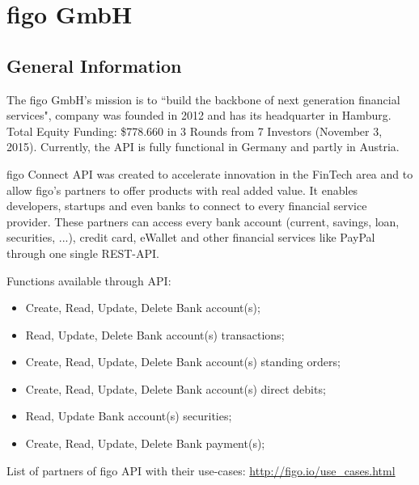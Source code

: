 \chapter{figo GmbH}
\section{General Information}
The figo GmbH’s mission is to “build the backbone of next generation financial services"\cite{figoFAQVision}, company was founded in 2012 and has its headquarter in Hamburg. Total Equity Funding: \$778.660 in 3 Rounds from 7 Investors (November 3, 2015). Currently, the API is fully functional in Germany and partly in Austria.\cite{figoAngel}\cite{figoCB}

figo Connect API was created to accelerate innovation in the FinTech area and to allow figo's partners to offer products with real added value. It enables developers, startups and even banks to connect to every financial service provider. These partners can access every bank account (current, savings, loan, securities, ...), credit card, eWallet and other financial services like PayPal through one single REST-API. \cite{figoFAQWhat}\cite{figoFAQVision}\cite{figoFAQPartners}

Functions available through API:\cite{figoAPI}
\begin{itemize}
	\item Create, Read, Update, Delete Bank account(s);
	\item Read, Update, Delete Bank account(s) transactions;
	\item Create, Read, Update, Delete Bank account(s) standing orders;
	\item Create, Read, Update, Delete Bank account(s) direct debits;
	\item Read, Update  Bank account(s) securities;
	\item Create, Read, Update, Delete Bank payment(s);
\end{itemize}
List of partners of figo API with their use-cases: \url{http://figo.io/use_cases.html} 



